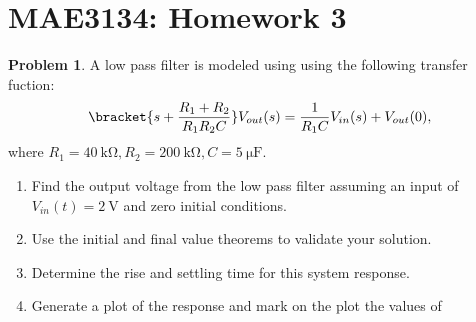 \documentclass[10pt]{article}
\date{}
\theoremstyle{definition}
\newtheorem{prob}{Problem}[section]
\newenvironment{subprob}%
{\renewcommand{\theenumi}{\alph{enumi}}\renewcommand{\labelenumi}{(\theenumi)}\begin{enumerate}}%
{\end{enumerate}}%
\begin{document}
\pagestyle{empty}
\section*{MAE3134: Homework 3}
\vspace*{-0.4cm}

\begin{prob}
    A low pass filter is modeled using using the following transfer fuction:
    \begin{align}
        \bracket{s + \frac{R_1 + R_2}{R_1 R_2 C}} V_{out}(s) = \frac{1}{R_1 C} V_{in}(s) + V_{out}(0), 
    \end{align}
    where \( R_1 = \SI{40}{\kilo\ohm}, R_2 = \SI{200}{\kilo\ohm}, C = \SI{5}{\micro\farad}\).

    \begin{subprob}
        \item Find the output voltage from the low pass filter assuming an input of \( V_{in}(t) = \SI{2}{\volt}\) and zero initial conditions.
        \item Use the initial and final value theorems to validate your solution.
        \item Determine the rise and settling time for this system response.
        \item Generate a plot of the response and mark on the plot the values of 
    \end{subprob}
\end{prob}
\end{document}
